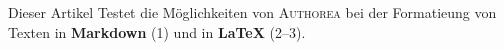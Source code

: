 Dieser Artikel Testet die Möglichkeiten von \textsc{Authorea} bei der Formatieung von Texten in \textbf{Markdown} (1) und in \textbf{LaTeX} (2–3).
